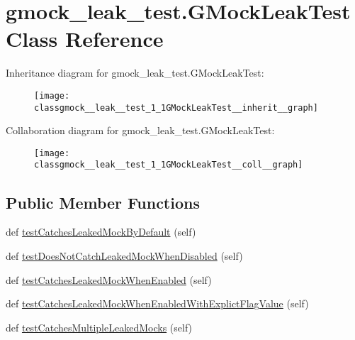 \hypertarget{classgmock__leak__test_1_1GMockLeakTest}{}\section{gmock\+\_\+leak\+\_\+test.\+G\+Mock\+Leak\+Test Class Reference}
\label{classgmock__leak__test_1_1GMockLeakTest}


Inheritance diagram for gmock\+\_\+leak\+\_\+test.\+G\+Mock\+Leak\+Test\+:\nopagebreak
\begin{figure}[H]
\begin{center}
\leavevmode
\texttt{[image: classgmock\_\_leak\_\_test\_1\_1GMockLeakTest\_\_inherit\_\_graph]}
\end{center}
\end{figure}


Collaboration diagram for gmock\+\_\+leak\+\_\+test.\+G\+Mock\+Leak\+Test\+:\nopagebreak
\begin{figure}[H]
\begin{center}
\leavevmode
\texttt{[image: classgmock\_\_leak\_\_test\_1\_1GMockLeakTest\_\_coll\_\_graph]}
\end{center}
\end{figure}
\subsection*{Public Member Functions}
\begin{DoxyCompactItemize}
\item 
def \hyperlink{classgmock__leak__test_1_1GMockLeakTest_ad87d271de7b3f106e51272d6e9139c76}{test\+Catches\+Leaked\+Mock\+By\+Default} (self)
\item 
def \hyperlink{classgmock__leak__test_1_1GMockLeakTest_a3107bf5a603558ab2d97d88fb5589951}{test\+Does\+Not\+Catch\+Leaked\+Mock\+When\+Disabled} (self)
\item 
def \hyperlink{classgmock__leak__test_1_1GMockLeakTest_a78f4040a392d183597f71d92da8c1246}{test\+Catches\+Leaked\+Mock\+When\+Enabled} (self)
\item 
def \hyperlink{classgmock__leak__test_1_1GMockLeakTest_ab19cf302ea06e1b186bd6ab951d9161e}{test\+Catches\+Leaked\+Mock\+When\+Enabled\+With\+Explict\+Flag\+Value} (self)
\item 
def \hyperlink{classgmock__leak__test_1_1GMockLeakTest_a09465b2bfde98834e4bb9563c035f034}{test\+Catches\+Multiple\+Leaked\+Mocks} (self)
\end{DoxyCompactItemize}


